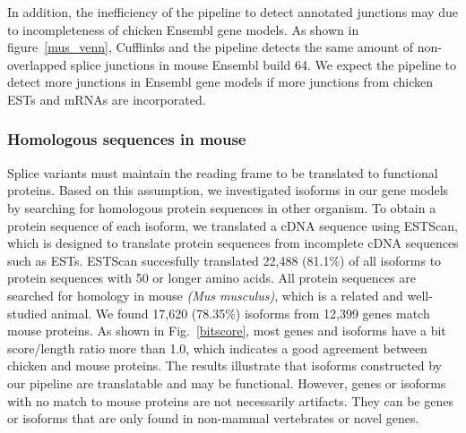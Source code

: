 \documentclass[10pt]{article}
\begin{document}
In addition, the inefficiency of the pipeline to detect annotated junctions may due to incompleteness of chicken Ensembl gene models.
As shown in figure~\ref{mus_venn}, Cufflinks and the pipeline detects the same amount of non-overlapped splice junctions in mouse Ensembl build 64.
We expect the pipeline to detect more junctions in Ensembl gene models if more junctions from chicken ESTs and mRNAs are incorporated.





\subsubsection*{Homologous sequences in mouse}
Splice variants must maintain the reading frame to be translated to functional proteins.
Based on this assumption, we investigated isoforms in our gene models by searching for homologous protein sequences in
other organism.
To obtain a protein sequence of each isoform, we translated a cDNA sequence using ESTScan\cite{Iseli:1999vd},
which is designed to translate protein sequences from incomplete cDNA sequences such as ESTs.
ESTScan succesfully translated 22,488 (81.1\%) of all isoforms to protein sequences with 50 or longer amino acids.
All protein sequences are searched for homology in mouse \textit{(Mus musculus)}, which is a related and well-studied animal.
We found 17,620 (78.35\%) isoforms from 12,399 genes match mouse proteins.
As shown in Fig.~\ref{bitscore}, most genes and isoforms have a bit score/length ratio more than 1.0, which
indicates a good agreement between chicken and mouse proteins.
The results illustrate that isoforms constructed by our pipeline are translatable and may be functional.
However, genes or isoforms with no match to mouse proteins are not necessarily artifacts.
They can be genes or isoforms that are only found in non-mammal vertebrates or novel genes.
\end{document}
